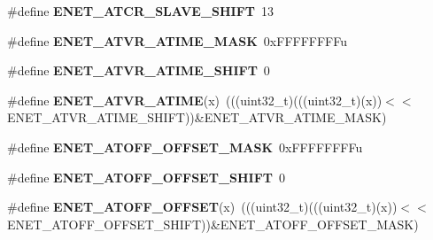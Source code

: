 \begin{DoxyCompactItemize}
\item 
\#define {\bfseries E\+N\+E\+T\+\_\+\+A\+T\+C\+R\+\_\+\+S\+L\+A\+V\+E\+\_\+\+S\+H\+I\+FT}~13\hypertarget{group__ENET__Register__Masks_gac12640c8f8383b91eafd801f7d13f218}{}\label{group__ENET__Register__Masks_gac12640c8f8383b91eafd801f7d13f218}

\item 
\#define {\bfseries E\+N\+E\+T\+\_\+\+A\+T\+V\+R\+\_\+\+A\+T\+I\+M\+E\+\_\+\+M\+A\+SK}~0x\+F\+F\+F\+F\+F\+F\+F\+Fu\hypertarget{group__ENET__Register__Masks_ga2714eeb8f8fc55584ae1f08903279268}{}\label{group__ENET__Register__Masks_ga2714eeb8f8fc55584ae1f08903279268}

\item 
\#define {\bfseries E\+N\+E\+T\+\_\+\+A\+T\+V\+R\+\_\+\+A\+T\+I\+M\+E\+\_\+\+S\+H\+I\+FT}~0\hypertarget{group__ENET__Register__Masks_gaf39338513eb4396791bd615bac83c136}{}\label{group__ENET__Register__Masks_gaf39338513eb4396791bd615bac83c136}

\item 
\#define {\bfseries E\+N\+E\+T\+\_\+\+A\+T\+V\+R\+\_\+\+A\+T\+I\+ME}(x)~(((uint32\+\_\+t)(((uint32\+\_\+t)(x))$<$$<$E\+N\+E\+T\+\_\+\+A\+T\+V\+R\+\_\+\+A\+T\+I\+M\+E\+\_\+\+S\+H\+I\+FT))\&E\+N\+E\+T\+\_\+\+A\+T\+V\+R\+\_\+\+A\+T\+I\+M\+E\+\_\+\+M\+A\+SK)\hypertarget{group__ENET__Register__Masks_gaccf108190376691ed3da804f145e3371}{}\label{group__ENET__Register__Masks_gaccf108190376691ed3da804f145e3371}

\item 
\#define {\bfseries E\+N\+E\+T\+\_\+\+A\+T\+O\+F\+F\+\_\+\+O\+F\+F\+S\+E\+T\+\_\+\+M\+A\+SK}~0x\+F\+F\+F\+F\+F\+F\+F\+Fu\hypertarget{group__ENET__Register__Masks_ga71beb7d6b82e503c872b4ca86033742d}{}\label{group__ENET__Register__Masks_ga71beb7d6b82e503c872b4ca86033742d}

\item 
\#define {\bfseries E\+N\+E\+T\+\_\+\+A\+T\+O\+F\+F\+\_\+\+O\+F\+F\+S\+E\+T\+\_\+\+S\+H\+I\+FT}~0\hypertarget{group__ENET__Register__Masks_ga6ee3bf7413489ccf980bb573591e692e}{}\label{group__ENET__Register__Masks_ga6ee3bf7413489ccf980bb573591e692e}

\item 
\#define {\bfseries E\+N\+E\+T\+\_\+\+A\+T\+O\+F\+F\+\_\+\+O\+F\+F\+S\+ET}(x)~(((uint32\+\_\+t)(((uint32\+\_\+t)(x))$<$$<$E\+N\+E\+T\+\_\+\+A\+T\+O\+F\+F\+\_\+\+O\+F\+F\+S\+E\+T\+\_\+\+S\+H\+I\+FT))\&E\+N\+E\+T\+\_\+\+A\+T\+O\+F\+F\+\_\+\+O\+F\+F\+S\+E\+T\+\_\+\+M\+A\+SK)\hypertarget{group__ENET__Register__Masks_ga5cf0d0c54f14f61d08d74f45edae8b40}{}\label{group__ENET__Register__Masks_ga5cf0d0c54f14f61d08d74f45edae8b40}


\end{DoxyCompactItemize}
